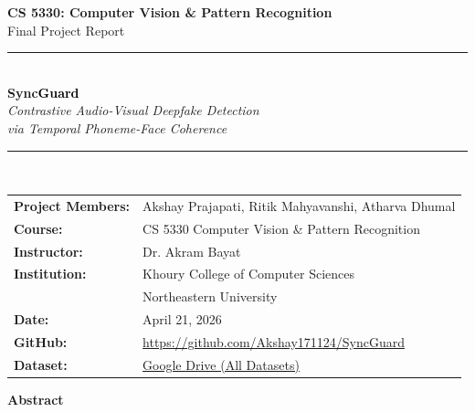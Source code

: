 \documentclass[12pt, letterpaper]{article}
\begin{document}

\begin{titlepage}
  \centering
  \vspace*{1.8cm}

  {\LARGE \textbf{CS 5330: Computer Vision \& Pattern Recognition}}\\[0.4cm]
  {\large Final Project Report}\\[1.4cm]

  \noindent\rule{\linewidth}{1.5pt}\\[0.5cm]
  {\Huge \textbf{\textcolor{accent}{Sync}\textcolor{black}{Guard}}}\\[0.4cm]
  {\Large \textit{Contrastive Audio-Visual Deepfake Detection\\[0.2cm]
  via Temporal Phoneme-Face Coherence}}\\[0.5cm]
  \noindent\rule{\linewidth}{1.5pt}\\[1.8cm]

  \begin{tabular}{ll}
    \textbf{Project Members:} & Akshay Prajapati, Ritik Mahyavanshi, Atharva Dhumal \\[0.4cm]
    \textbf{Course:}          & CS 5330 Computer Vision \& Pattern Recognition \\[0.4cm]
    \textbf{Instructor:}      & Dr. Akram Bayat \\[0.4cm]
    \textbf{Institution:}     & Khoury College of Computer Sciences \\
                              & Northeastern University \\[0.4cm]
    \textbf{Date:}            & April 21, 2026 \\[0.4cm]
    \textbf{GitHub:}          & \url{https://github.com/Akshay171124/SyncGuard} \\[0.4cm]
    \textbf{Dataset:}         & \href{https://drive.google.com/drive/folders/1wQ9cdWo5R9O8ZvwPO7XUnfMvVOgoIF1E}{Google Drive (All Datasets)} \\
  \end{tabular}

  \vfill
\end{titlepage}

\begin{center}
\textbf{\large Abstract}
\end{center}
\vspace{0.3cm}
\end{document}
